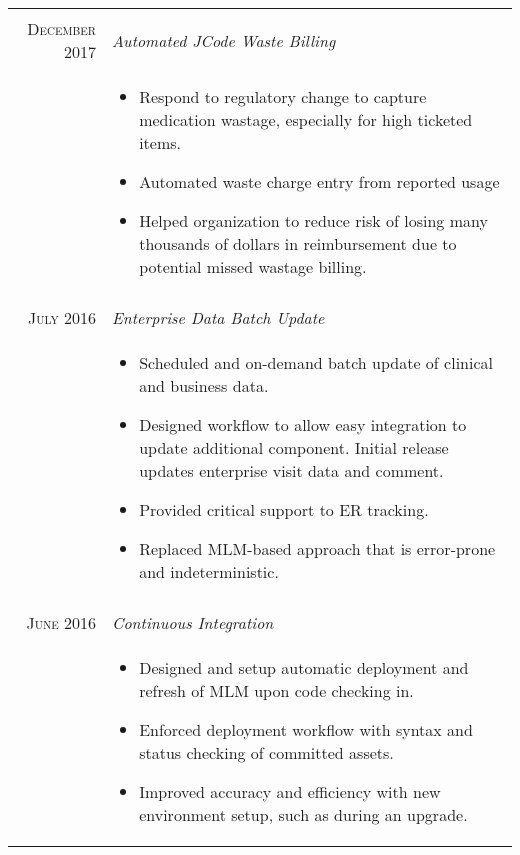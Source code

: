 \documentclass[letter,11pt,DIV=20]{scrartcl}
\begin{document}
\begin{tabu}{r|X}
   \\  
  
   \textsc{December 2017} & \emph{Automated JCode Waste Billing}
   \\ &{\small\vspace{-0.5em} 
  \begin{itemize}[topsep=0pt,nosep,noitemsep,leftmargin=1em]
       \item Respond to regulatory change to capture medication wastage, especially for high ticketed items.
      \item Automated waste charge entry from reported usage 
      \item Helped organization to reduce risk of losing many thousands of dollars in reimbursement due to potential missed wastage billing.
  \end{itemize}} \\   
   \\
  
   \textsc{July 2016} & \emph{Enterprise Data Batch Update}
   \\ &{\small\vspace{-0.5em} 
  \begin{itemize}[topsep=0pt,nosep,noitemsep,leftmargin=1em]
       \item Scheduled and on-demand batch update of clinical and business data.
       \item Designed workflow to allow easy integration to update additional component. Initial release updates enterprise visit data and comment.
       \item Provided critical support to ER tracking.
       \item Replaced MLM-based approach that is error-prone and indeterministic.
  \end{itemize}} \\ 
  
   \\
  
   \textsc{June 2016} & \emph{Continuous Integration}
   \\ &{\small\vspace{-0.5em} 
  \begin{itemize}[topsep=0pt,nosep,noitemsep,leftmargin=1em]
       \item Designed and setup automatic deployment and refresh of MLM upon code checking in.
       \item Enforced deployment workflow with syntax and status checking of committed assets.
       \item Improved accuracy and efficiency with new environment setup, such as during an upgrade.
  \end{itemize}} \\
  

\end{tabu}
\end{document}
